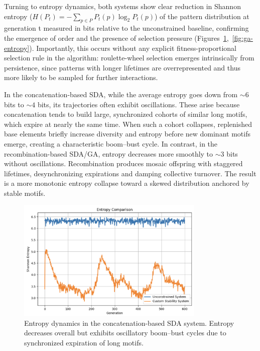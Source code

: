 \documentclass[life,article,submit,pdftex,moreauthors]{Definitions/mdpi}
\begin{document}
Turning to entropy dynamics, both systems show clear reduction in Shannon entropy ($H(P_t) = - \sum_{p \in P} P_t(p) \log_2 P_t(p)$) of
the pattern distribution at generation t measured in bits relative to the unconstrained baseline, confirming the emergence of order and the presence of selection pressure (Figures~\ref{fig:concat-entropy},~\ref{fig:ga-entropy}). Importantly, this occurs without any explicit fitness-proportional selection rule in the algorithm: roulette-wheel selection emerges intrinsically from persistence, since patterns with longer lifetimes are overrepresented and thus more likely to be sampled for further interactions.

In the concatenation-based SDA, while the average entropy goes down from $\sim6$ bits to $\sim4$ bits, its trajectories often exhibit oscillations. These arise because concatenation tends to build large, synchronized cohorts of similar long motifs, which expire at nearly the same time. When such a cohort collapses, replenished base elements briefly increase diversity and entropy before new dominant motifs emerge, creating a characteristic boom–bust cycle. In contrast, in the recombination-based SDA/GA, entropy decreases more smoothly to $\sim3$ bits without oscillations. Recombination produces mosaic offspring with staggered lifetimes, desynchronizing expirations and damping collective turnover. The result is a more monotonic entropy collapse toward a skewed distribution anchored by stable motifs.

\begin{figure}[H]
    \centering
    \includegraphics[width=0.8\textwidth]{SDA-concat-entropy.png}
    \caption{Entropy dynamics in the concatenation-based SDA system. Entropy decreases overall but exhibits oscillatory boom–bust cycles due to synchronized expiration of long motifs.}
    \label{fig:concat-entropy}
\end{figure}
\end{document}
